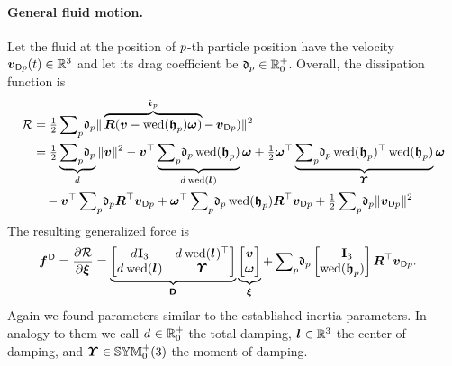 \paragraph{General fluid motion.}
Let the fluid at the position of $p$-th particle position have the velocity $\boldsymbol{v}_{\mathsf{D}p}(t)\in\mathbb{R}^3$ and let its drag coefficient be $\mathfrak{d}_{p}\in\mathbb{R}^{+}_{0}$.
Overall, the dissipation function is
\begin{align}
 \dissFkt &= \tfrac{1}{2} \sumParticles \!\particleDamping{\PidxI} \norm{\overbrace{\R(\v - \wedOp(\particleBodyPos{\PidxI})\w)}^{\particlePosd{\PidxI}} - \, \tuple{v}_{\mathsf{D}\PidxI})}^2
\nonumber\\
 &= \tfrac{1}{2} \underbrace{\sumParticles \!\particleDamping{\PidxI}}_{\bodyDamping{}{}} \norm{\v}^2
  - \v^\top \underbrace{\sumParticles \!\particleDamping{\PidxI} \wedOp(\particleBodyPos{\PidxI})}_{\bodyDamping{}{} \wedOp(\bodyCOD{}{})} \w
  + \tfrac{1}{2} \w^\top \underbrace{\sumParticles \!\particleDamping{\PidxI} \wedOp(\particleBodyPos{\PidxI})^\top \wedOp(\particleBodyPos{\PidxI})}_{\bodyMOD{}{}} \w
\nonumber\\
 &\quad - \v^\top \sumParticles \!\particleDamping{\PidxI} \R^\top \tuple{v}_{\mathsf{D}\PidxI}
  + \w^\top \sumParticles \!\particleDamping{\PidxI} \wedOp(\particleBodyPos{\PidxI}) \R^\top \tuple{v}_{\mathsf{D}\PidxI}
 + \tfrac{1}{2} \sumParticles \!\particleDamping{\PidxI} \norm{\tuple{v}_{\mathsf{D}\PidxI}}^2
\end{align}
The resulting generalized force is
\begin{align}
 \bodyGenForceDiss{}{} &= \pdiff[\dissFkt]{\bodyVel{}{}} =
 \underbrace{\begin{bmatrix} \bodyDamping{}{}\idMat[3] & \bodyDamping{}{} \wedOp(\bodyCOD{}{})^\top \\ \bodyDamping{}{} \wedOp(\bodyCOD{}{}) & \bodyMOD{}{} \end{bmatrix}}_{\bodyDissMat{}{}}
 \underbrace{\begin{bmatrix} \v \\ \w \end{bmatrix}}_{\bodyVel{}{}}
 +
 \sumParticles \!\particleDamping{\PidxI} \begin{bmatrix} -\idMat[3] \\ \wedOp(\particleBodyPos{\PidxI}) \end{bmatrix} \R^\top \tuple{v}_{\mathsf{D}\PidxI}.
\end{align}
Again we found parameters similar to the established inertia parameters.
In analogy to them we call $\bodyDamping{}{}\in\RealNumSP$ the total damping, $\bodyCOD{}{}\in\RealNum^3$ the center of damping, and $\bodyMOD{}{}\in\SymMatSP(3)$ the moment of damping.

